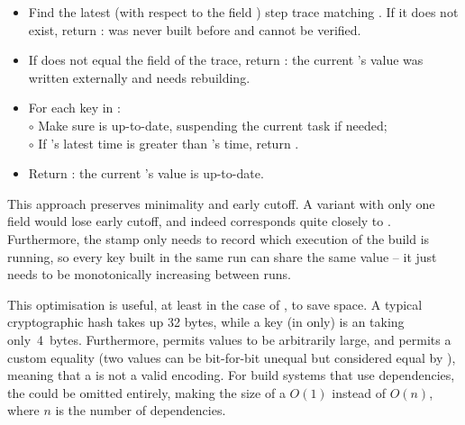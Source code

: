 \begin{itemize}
\item Find the latest (with respect to the field ) step trace matching
  . If it does not exist, return :  was never built
  before and cannot be verified.
\item If  does not equal the  field of the trace, return
  : the current 's value was written externally and needs
  rebuilding.
\item For each key  in :\\
  $\circ$ Make sure  is up-to-date, suspending the current task if needed;\\
  $\circ$ If 's latest  time is greater than 's
     time, return .
\item Return : the current 's value is up-to-date.
\end{itemize}

\noindent
This approach preserves minimality and early cutoff. A variant with only one
 field would lose early cutoff, and indeed corresponds quite closely to
\Make. Furthermore, the  stamp only needs to record which execution of
the build is running, so every key built in the same run can share the same
 value -- it just needs to be monotonically increasing between runs.

This optimisation is useful, at least in the case of \Shake, to save space. A
typical cryptographic hash takes up 32 bytes, while a key (in \Shake only) is an
 taking only~4~bytes. Furthermore, \Shake permits values to be
arbitrarily large, and permits a custom equality (two values can be bit-for-bit
unequal but considered equal by \Shake), meaning that a  is not a valid
encoding. For build systems that use  dependencies, the
 could be omitted entirely, making the size of a 
$O(1)$ instead of $O(n)$, where $n$ is the number of dependencies.

